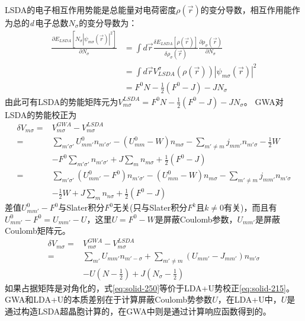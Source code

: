 LSDA的电子相互作用势能是总能量对电荷密度$\rho(\vec r)$的变分导数，相互作用能作为总的{\it d}\,电子总数$N_{\sigma}$的变分导数为：
\begin{equation}
  \begin{split}
    \frac{\partial E_{LSDA}[N_{\sigma}|\psi_{m\sigma}(\vec r)|^2]}{\partial N_{\sigma}}&=\int d\vec r\frac{\delta E_{LSDA}[\rho(\vec r)]}{\delta\rho_{\sigma}(\vec r)}\frac{\partial\rho_{\sigma}(\vec r)}{\partial N_{\sigma}}\\
    &=\int d\vec rV_{LSDA}^{\sigma}(\rho(\vec r))|\psi_{m\sigma}(\vec r)|^2\\
    &=F^0N-\frac12(F^0-J)-JN_{\sigma}
  \end{split}
  \label{eq:solid-257}
\end{equation}
由此可有LSDA的势能矩阵元为$V_{m\sigma}^{LSDA}=F^0N-\frac12(F^0-J)-JN_{\sigma}$。
GWA对LSDA的势能校正为\cite{JPCM9-767_1997}
\begin{equation}
  \begin{split}
    \delta V_{m\sigma}=&V_{m\sigma}^{GWA}-V_{m\sigma}^{LSDA}\\
    =&\sum_{m'\sigma'}U_{mm'}^0n_{m'\sigma'}-(U_{mm}^0-W)n_{m\sigma}-\sum_{m'\neq m}j_{mm'}n_{m'\sigma}-\frac12W\\
    &-F^0\sum_{m'\sigma'}n_{m'\sigma'}+J\sum_mn_{m\sigma}+\frac12(F^0-J)\\
    =&\sum_{m'\sigma'}(U_{mm'}^0-F^0)n_{m'\sigma'}-(U_{mm}^0-W)n_{m\sigma}-\sum_{m'\neq m}j_{mm'}n_{m'\sigma}\\
    &-\frac12W+J\sum_mn_{n\sigma}+\frac12(F^0-J)
  \end{split}
  \label{eq:solid-249}
\end{equation}
差值$U_{mm'}^0-F^0$与Slater积分$F^0$无关(只与Slater积分$F^k$且$k\neq0$有关)，而且有$U_{mm'}^0-F^0=U_{mm'}-U$，这里$U=F^0-W$是屏蔽Coulomb参数，$U_{mm'}$是屏蔽Coulomb矩阵元。
\begin{equation}
  \begin{split}
    \delta V_{m\sigma}=&V_{m\sigma}^{GWA}-V_{m\sigma}^{LSDA}\\
    =&\sum_{m'}U_{mm'}n_{m'-\sigma}+\sum_{m'\neq m}(U_{mm'}-J_{mm'})n_{m'\sigma}\\
    &-U(N-\frac12)+J(N_{\sigma}-\frac12)
  \end{split}
  \label{eq:solid-250}
\end{equation}
如果占据矩阵是对角化的，式\eqref{eq:solid-250}等价于LDA+U势校正\eqref{eq:solid-215}。GWA和LDA+U的本质差别在于计算屏蔽Coulomb势参数$U$，在LDA+U中，$U$是通过构造LSDA超晶胞计算的，在GWA中则是通过计算响应函数得到的。
%
